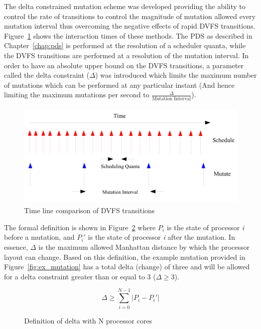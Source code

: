 The delta constrained mutation scheme was developed providing the ability to control the rate of transitions
to control the magnitude of mutation allowed every mutation interval thus overcoming the negative effects
of rapid DVFS transitions. Figure~\ref{fig:schedule_mutate} shows the interaction times of these methods. 
The PDS as described in Chapter~\ref{chap:pds} is performed at the resolution of a scheduler quanta, while
the DVFS transitions are performed at a resolution of the mutation interval. In order to have an absolute
upper bound on the DVFS transitions, a parameter called the delta constraint ($\Delta$) was introduced
which limits the maximum number of mutations which can be performed at any particular instant (And hence
limiting the maximum mutations per second to $\frac{\Delta}{\text{Mutation Interval}}$). 

\begin{figure}[h!]
  \begin{center}
    \includegraphics[height=2in]{Figures/Schedule_Mutate.jpg}%
    \caption{Time line comparison of DVFS transitions}
    \label{fig:schedule_mutate}
  \end{center}
\end{figure}


The formal definition is shown in Figure~\ref{fig:Delta_def} where $P_{i}$ is the state of processor \textit{i} 
before a mutation, and $P_{i}'$ is the state of processor \textit{i} after the mutation.
In essence, $\Delta$ is the maximum allowed Manhattan distance by which the processor layout can change. 
Based on this definition, the example mutation provided in Figure~\ref{fig:ex_mutation} has 
a total delta (change) of three and will be allowed for a delta constraint greater than
or equal to 3 ($\Delta \geq 3$).

\begin{figure}[h!]
\centering
\begin{equation*}
    \Delta \geq \displaystyle\sum_{i=0}^{N-1} {| P_{i} - P_{i}' |}
\end{equation*}
\caption{Definition of delta with N processor cores}
\label{fig:Delta_def}
\end{figure}

